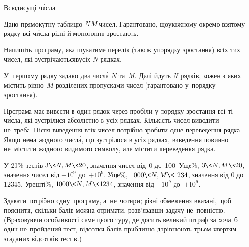 ﻿\begin{problemAllDefault}{Всюдисущі ч\'{и}сла}

Дано прямокутну таблицю $N{\*}M$\nolinebreak[3] чисел. Гарантовано, що\nolinebreak[2] у\nolinebreak[3] кожному окремо взятому рядку всі ч\'{и}сла різні й монотонно зростають.

Напишіть програму, яка шукатиме перелік (також у\nolinebreak[3] порядку зростання) всіх тих чисел, які зустрічаються\linebreak[1] в\nolinebreak[3] усіх $N$ рядках.

\InputFile У~першому рядку задано два числ\'{а} $N$ та~$M$. Далі йдуть $N$ рядків, кожен з яких містить рівно~$M$ розділених пропусками чисел (гарантовано у~порядку зростання). 

\OutputFile	Програма має вивести в один рядок через пробіли у порядку зростання всі ті ч\'{и}сла, які зустрілися абсолютно в усіх рядках. Кількість чисел виводити не~треба. Після виведення всіх чисел потрібно зробити одне переведення рядка. Якщо нема жодного числ\'{а}, що зустрілося в усіх рядках, виведення повинно не~містити жодного видимого символу, але містити переведення рядка.


\Example
\begin{exampleSimple}{6em}{3em}%
%
\end{exampleSimple}

\Scoring
У 20\% тестів $3{\<}{N,M}{\<}20$, значення чисел від~0 до~100.
%
У\nolinebreak[3] ще\%\nolinebreak[2], $3{\<}{N,M}{\<}20$, значення чисел від $-10^9$ до~$+10^9$.
%
У\nolinebreak[3] ще\%\nolinebreak[2], $1000{\<}{N,M}{\<}1234$, значення від 0 до 12345.
%
У\nolinebreak[3] решті\%\nolinebreak[2], $1000{\<}{N,M}{\<}1234$, значення від $-10^9$ до~$+10^9$.

Здавати потрібно одну програму, а~не~чотири; різні обмеження вказані, щоб пояснити, скільки балів можна отримати, розв’язавши задачу не~повністю.
(Враховуючи особливості саме цього туру, де досить великий штраф за хоча~б один не~пройдений тест, відсотки балів приблизно дорівнюють трьом чвертям 
згаданих відсотків тестів.)


\end{problemAllDefault}
